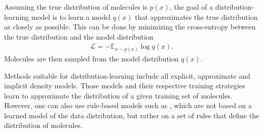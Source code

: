 Assuming the true distribution of molecules is $p(x)$, the goal of a distribution-learning model is
to learn a model $q(x)$ that approximates the true distribution as closely as possible. This can be
done by minimizing the cross-entropy between the true distribution and the model distribution
\begin{align}
      \mathcal{L} = - \mathbb{E}_{x \sim p(x)} \log q(x).
\end{align}
Molecules are then sampled from the model distribution $q(x)$.

Methods suitable for distribution-learning include all explicit, approximate and implicit density
models. Those models and their respective training strategies learn to approximate the distribution
of a given training set of molecules. However, one can also use rule-based models such as
\citep{jensenGraphbasedGeneticAlgorithm2019}, which are not based on a learned model of the data
distribution, but rather on a set of rules that define the distribution of molecules.



